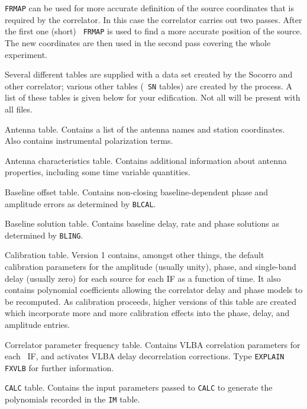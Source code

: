 {\tt FRMAP} can be used for more accurate definition of the source
coordinates that is required by the correlator.  In this case the
correlator carries out two passes.  After the first one (short) {\tt
FRMAP} is used to find a more accurate position of the source.  The
new coordinates are then used in the second pass covering the whole
experiment.


Several different tables are supplied with a  data set
created by the Socorro and other correlator; various other tables
(\eg\ {\tt SN} tables) are created by the  process.
A  list of these tables is given below for your edification.  Not all
 will be present with all files.

\beddes
\item[ AN ]{Antenna table. Contains a list of the antenna names
      and station coordinates.  Also contains instrumental
      polarization terms.}
\item[ AT ]{Antenna characteristics table. Contains additional
      information about antenna properties, including some time
      variable quantities.}
\item[ BL ]{Baseline offset table. Contains non-closing
       baseline-dependent phase and amplitude errors as determined by
       {\tt BLCAL}\@.}
\item[ BS ]{Baseline solution table.  Contains baseline delay, rate
       and phase solutions as determined by {\tt BLING}\@.}
\item[ CL ]{Calibration table.  Version 1 contains, amongst other
      things, the default calibration parameters for the amplitude
      (usually unity), phase, and single-band delay (usually zero) for
      each source for each IF as a function of time.  It also contains
      polynomial coefficients allowing the correlator delay and phase
      models to be recomputed.  As calibration proceeds, higher
      versions of this table are created which incorporate more and
      more calibration effects into the phase, delay, and amplitude
      entries.}
\item[ CQ ]{Correlator parameter frequency table. Contains VLBA
       correlation parameters for each \AIPS\ IF, and activates VLBA
       delay decorrelation corrections. Type {\tt EXPLAIN FXVLB} for
       further information.}
\item[ CT ]{{\tt CALC} table. Contains the input parameters passed to
       {\tt CALC} to generate the polynomials recorded in the {\tt IM}
       table.}
